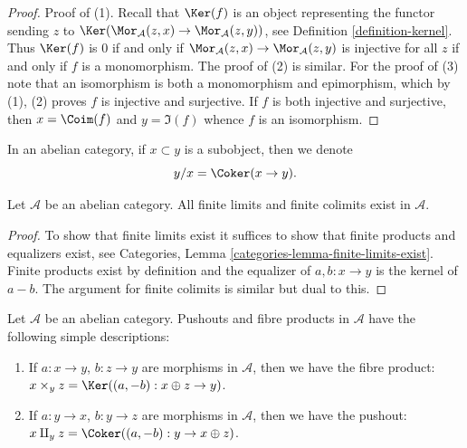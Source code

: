 \begin{proof}
Proof of (1). Recall that $\Ker(f)$ is an object representing the
functor sending $z$ to
$\Ker(\Mor_\mathcal{A}(z, x) \to \Mor_\mathcal{A}(z, y))$, see
Definition \ref{definition-kernel}.
Thus $\Ker(f)$ is $0$ if and only if
$\Mor_\mathcal{A}(z, x) \to \Mor_\mathcal{A}(z, y)$
is injective for all $z$ if and only if $f$ is a monomorphism.
The proof of (2) is similar.
For the proof of (3) note that an isomorphism is both a monomorphism
and epimorphism, which by (1), (2) proves $f$ is injective
and surjective. If $f$ is both injective and surjective, then
$x = \Coim(f)$ and $y = \Im(f)$ whence $f$ is an isomorphism.
\end{proof}

\noindent
In an abelian category, if $x \subset y$ is a subobject,
then we denote
$$
y/x = \Coker(x \to y).
$$

\begin{lemma}
\label{lemma-colimit-abelian-category}
Let $\mathcal{A}$ be an abelian category.
All finite limits and finite colimits exist in $\mathcal{A}$.
\end{lemma}

\begin{proof}
To show that finite limits exist it suffices to show
that finite products and equalizers exist, see
Categories, Lemma \ref{categories-lemma-finite-limits-exist}.
Finite products exist
by definition and the equalizer of $a, b : x \to y$ is
the kernel of $a - b$. The argument for finite colimits
is similar but dual to this.
\end{proof}

\begin{example}
\label{example-fibre-product-pushouts}
Let $\mathcal{A}$ be an abelian category.
Pushouts and fibre products in $\mathcal{A}$ have the following
simple descriptions:
\begin{enumerate}
\item If $a : x \to y$, $b : z \to y$ are morphisms in $\mathcal{A}$, then
we have the fibre product:
$x \times_y z = \Ker((a, -b) : x \oplus z \to y)$.
\item If $a : y \to x$, $b : y \to z$ are morphisms in $\mathcal{A}$, then
we have the pushout:
$x \amalg_y z = \Coker((a, -b) : y \to x \oplus z)$.
\end{enumerate}
\end{example}

